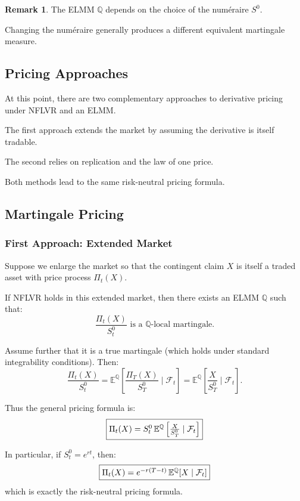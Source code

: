 \documentclass[12pt,a4paper]{article}
\theoremstyle{definition}
\newtheorem{remark}{Remark}[section]
\begin{document}
\begin{remark}
The ELMM $\mathbb{Q}$ depends on the choice of the numéraire $S^0$.

Changing the numéraire generally produces a different equivalent martingale measure.
\end{remark}

\subsection{Pricing Approaches}

At this point, there are two complementary approaches to derivative pricing under NFLVR and an ELMM.

The first approach extends the market by assuming the derivative is itself tradable.

The second relies on replication and the law of one price.

Both methods lead to the same risk-neutral pricing formula.

\subsection{Martingale Pricing}

\subsubsection{First Approach: Extended Market}

Suppose we enlarge the market so that the contingent claim $X$ is itself a traded asset with price process $\Pi_t(X)$.

If NFLVR holds in this extended market, then there exists an ELMM $\mathbb{Q}$ such that:
\[
\frac{\Pi_t(X)}{S_t^0} \text{ is a } \mathbb{Q}\text{-local martingale}.
\]

Assume further that it is a true martingale (which holds under standard integrability conditions). Then:
\[
\frac{\Pi_t(X)}{S_t^0} = \mathbb{E}^\mathbb{Q}\left[\frac{\Pi_T(X)}{S_T^0} \mid \mathcal{F}_t\right] = \mathbb{E}^\mathbb{Q}\left[\frac{X}{S_T^0} \mid \mathcal{F}_t\right].
\]

Thus the general pricing formula is:
\[
\fbox{$\Pi_t(X) = S_t^0 \, \mathbb{E}^\mathbb{Q}\left[\frac{X}{S_T^0} \mid \mathcal{F}_t\right]$}
\]

In particular, if $S_t^0 = e^{rt}$, then:
\[
\fbox{$\Pi_t(X) = e^{-r(T-t)} \, \mathbb{E}^\mathbb{Q}[X \mid \mathcal{F}_t]$}
\]
which is exactly the risk-neutral pricing formula.
\end{document}
